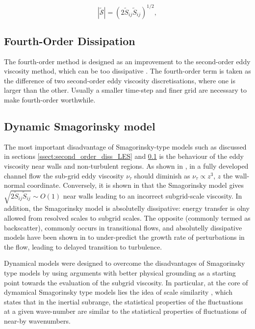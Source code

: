 \begin{equation}
\left | \mathcal{\tilde S} \right | = (2 \tilde S_{ij} \tilde S_{ij})^{1/2},
\end{equation}


\subsection{Fourth-Order Dissipation}
\label{ssect:fourth_order_diss_LES}

The fourth-order method is designed as an improvement to the second-order eddy viscosity method, which can be too dissipative \citep{adam}. The fourth-order term is taken as the difference of two second-order eddy viscosity discretisations, where one is larger than the other. Usually a smaller time-step and finer grid are necessary to make fourth-order worthwhile.

\subsection{Dynamic Smagorinsky model}

The most important disadvantage of Smagorinsky-type models such as discussed in sections \ref{ssect:second_order_diss_LES} and \ref{ssect:fourth_order_diss_LES} is the behaviour of the eddy viscosity near walls and non-turbulent regions. As shown in \citet{pope2000}, in a fully developed channel flow the sub-grid eddy viscosity $\nu_\tau$ should diminish as $\nu_\tau \propto z^3$, $z$ the wall-normal coordinate. Conversely, it is shown in \citet{nicoud1999} that the Smagorinsky model gives $\sqrt{2 \tilde{S}_{ij} \tilde{S}_{ij}} \sim O(1)$ near walls leading to an incorrect subgrid-scale viscosity. In addition, the Smagorinsky model is absolutelly dissipative: energy transfer is olny allowed from resolved scales to subgrid scales. The opposite (commonly termed as backscatter), commonly occurs in transitional flows, and absolutelly dissipative models have been shown in \citet{piomelli1990} to under-predict the growth rate of perturbations in the flow, leading to delayed transition to turbulence.%
\par
Dynamical models were designed to overcome the disadvantages of Smagorinsky type models by using arguments with better physical grounding as a starting point towards the evaluation of the subgrid viscosity. In particular, at the core of dymamical Smagorinsky type models lies the idea of scale similarity \citep{bardina1980}, which states that in the inertial subrange, the statistical properties of the fluctuations at a given wave-number are similar to the statistical properties of fluctuations of near-by wavenumbers.

